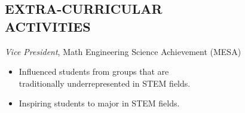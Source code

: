 \documentclass[line,margin]{res}
\begin{document}
\begin{resume}
\section{EXTRA-CURRICULAR \\ ACTIVITIES}             
                  {\sl Vice President}, Math Engineering Science 
                        Achievement (MESA) \\
                  \begin{itemize} \itemsep -4pt
                     \item Influenced students from groups that are \\
                        traditionally underrepresented in STEM fields.
                     \item Inspiring students to major in STEM fields.
                  \end{itemize}


\end{resume}
\end{document}
